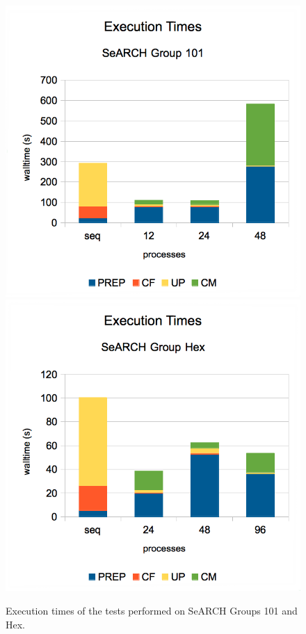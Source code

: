 \begin{figure}
	\begin{center}
		\includegraphics[width=\columnwidth]{report.may/images/exectime101.png}
		\includegraphics[width=\columnwidth]{report.may/images/exectimehex.png}
	\end{center}
	\caption[Execution times]{Execution times of the tests performed on SeARCH Groups 101 and Hex.}
	\label{fig:exectime}
\end{figure}


